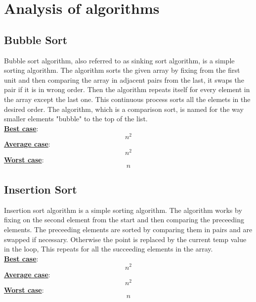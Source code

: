 \documentclass{IEEEtran}
\begin{document}
\section{Analysis of algorithms}
\label{sec:anal}
\subsection{Bubble Sort}
Bubble sort algorithm, also referred to as sinking sort algorithm, is a simple sorting algorithm. The algorithm sorts the given array by fixing from the first unit and then comparing the array in adjacent pairs from the last, it swaps the pair if it is in wrong order. Then the algorithm repeats itself for every element in the array except the last one. This continuous process sorts all the elemets in the desired order. The algorithm, which is a comparison sort, is named for the way smaller elements "bubble" to the top of the list. \\
\textbf{\underline{Best case}}: \[n^2\]
\textbf{\underline{Average case}}: \[n^2\] 
\textbf{\underline{Worst case}}:\[n\]

\subsection{Insertion Sort}
Insertion sort algorithm is a simple sorting algorithm. The algorithm works by fixing on the second element from the start and then comparing the preceeding elements. The preceeding elements are sorted by comparing them in pairs and are swapped if necessary. Otherwise the point is replaced by the current temp value in the loop, This repeats for all the succeeding elements in the array.\\
\textbf{\underline{Best case}}: \[n^2\]
\textbf{\underline{Average case}}: \[n^2\] 
\textbf{\underline{Worst case}}:\[n\]  

\end{document}
